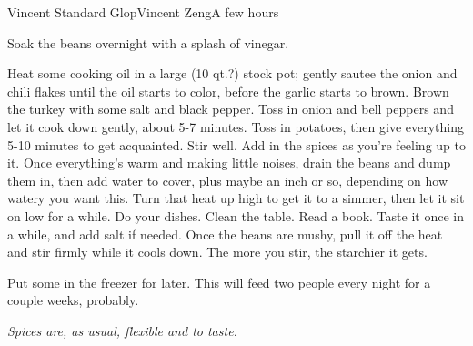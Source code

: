 \begin{recipe}{Vincent Standard Glop}{Vincent Zeng}{A few hours}


    Soak the beans overnight with a splash of vinegar.

    Heat some cooking oil in a large (10 qt.?) stock pot; gently sautee the
    onion and chili flakes until the oil starts to color, before the garlic
    starts to brown. Brown the turkey with some salt and black pepper. Toss in
    onion and bell peppers and let it cook down gently, about 5-7 minutes. Toss
    in potatoes, then give everything 5-10 minutes to get acquainted. Stir well.
    Add in the spices as you're feeling up to it. Once everything's warm and
    making little noises, drain the beans and dump them in, then add water to
    cover, plus maybe an inch or so, depending on how watery you want this. Turn
    that heat up high to get it to a simmer, then let it sit on low for a while.
    Do your dishes. Clean the table. Read a book. Taste it once in a while, and
    add salt if needed. Once the beans are mushy, pull it off the heat and stir
    firmly while it cools down. The more you stir, the starchier it gets.

    Put some in the freezer for later. This will feed two people every night for
    a couple weeks, probably.

\end{recipe}

\it{Spices are, as usual, flexible and to taste.}
